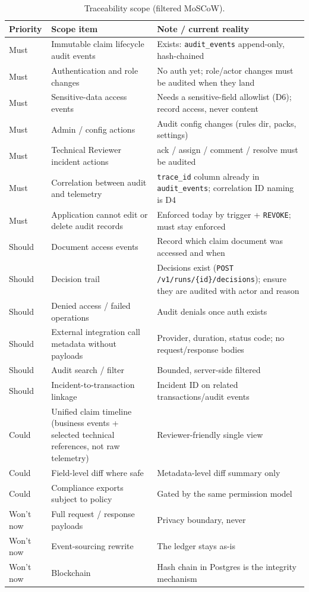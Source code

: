 \documentclass[11pt]{article}
\newcommand{\code}[1]{\texttt{#1}}
\begin{document}
\begin{table}[h]
\centering
\small
\begin{tabularx}{\textwidth}{@{} l L L @{}}
\toprule
\textbf{Priority} & \textbf{Scope item} & \textbf{Note / current reality} \\
\midrule
Must & Immutable claim lifecycle audit events &
Exists: \code{audit\_events} append-only, hash-chained \\
Must & Authentication and role changes &
No auth yet; role/actor changes must be audited when they land \\
Must & Sensitive-data access events &
Needs a sensitive-field allowlist (D6); record access, never content \\
Must & Admin / config actions &
Audit config changes (rules dir, packs, settings) \\
Must & Technical Reviewer incident actions &
ack / assign / comment / resolve must be audited \\
Must & Correlation between audit and telemetry &
\code{trace\_id} column already in \code{audit\_events}; correlation ID naming
is D4 \\
Must & Application cannot edit or delete audit records &
Enforced today by trigger + \code{REVOKE}; must stay enforced \\
\midrule
Should & Document access events &
Record which claim document was accessed and when \\
Should & Decision trail &
Decisions exist (\code{POST /v1/runs/\{id\}/decisions}); ensure they are
audited with actor and reason \\
Should & Denied access / failed operations &
Audit denials once auth exists \\
Should & External integration call metadata without payloads &
Provider, duration, status code; no request/response bodies \\
Should & Audit search / filter &
Bounded, server-side filtered \\
Should & Incident-to-transaction linkage &
Incident ID on related transactions/audit events \\
\midrule
Could & Unified claim timeline (business events + selected technical
references, not raw telemetry) &
Reviewer-friendly single view \\
Could & Field-level diff where safe &
Metadata-level diff summary only \\
Could & Compliance exports subject to policy &
Gated by the same permission model \\
\midrule
Won't now & Full request / response payloads &
Privacy boundary, never \\
Won't now & Event-sourcing rewrite &
The ledger stays as-is \\
Won't now & Blockchain &
Hash chain in Postgres is the integrity mechanism \\
\bottomrule
\end{tabularx}
\caption{Traceability scope (filtered MoSCoW).}
\label{tab:trace-must}
\end{table}
\end{document}
